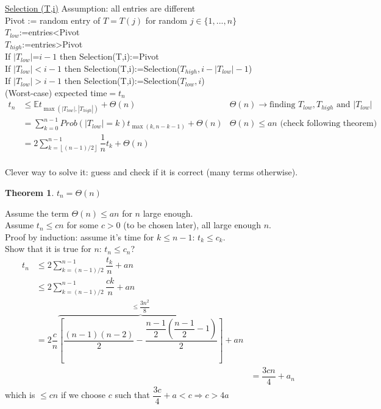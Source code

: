 \documentclass[12pt,a4paper]{report}
\theoremstyle{break}
\newtheorem{theorem}{Theorem}
\newenvironment{proof}[1][Proof]{\begin{trivlist}
\item[\hskip \labelsep {\bfseries #1}]}{\end{trivlist}}
\begin{document}
\underline{Selection (T,i)} \hspace*{3cm} Assumption: all entries are different\\

\hspace*{0.9cm} Pivot := random entry of $T=T(j)$ for random $j\in \lbrace 1,...,n\rbrace$\\
\hspace*{1.5cm} $T_{low}$:=entries<Pivot\\
\hspace*{1.5cm} $T_{high}$:=entries>Pivot\\
\hspace*{1.5cm} If $|T_{low}|$=$i-1$ then Selection(T,i):=Pivot\\
\hspace*{1.5cm} If $|T_{low}|<i-1$ then Selection(T,i):=Selection($T_{high},i-|T_{low}|-1$)\\
\hspace*{1.5cm} If $|T_{low}|>i-1$ then Selection(T,i):=Selection($T_{low},i$)\\

(Worst-case) expected time$=t_n$\\
\begin{align*}
t_n &\leq \mathbb{E} t_{\max(|T_{low}|,|T_{high}|)}+\Theta (n) & \Theta (n)\rightarrow \text{finding }T_{low},T_{high}\text{ and }|T_{low}|\\
&=\sum\limits_{k=0}^{n-1}Prob(|T_{low}|=k)t_{\max(k,n-k-1)}+\Theta (n) & \Theta (n)\leq an \text{ (check following theorem)}\\
&=2\sum\limits_{k=\left\lfloor (n-1)/2\right\rfloor}^{n-1}\dfrac{1}{n}t_k+\Theta (n)&\\
\end{align*}

Clever way to solve it: guess and check if it is correct (many terms otherwise).\\

\begin{theorem}
$t_n=\Theta (n)$
\end{theorem}
\begin{proof}
Assume the term $\Theta (n)\leq an$ for $n$ large enough.\\
Assume $t_n\leq cn$ for some $c>0$ (to be chosen later), all large enough $n$.\\
Proof by induction: assume it's time for $k\leq n-1$: $t_k\leq c_k$.\\
Show that it is true for $n$: $t_n\leq c_n$?
\begin{align*}
t_n &\leq 2\sum\limits_{k=(n-1)/2}^{n-1}\dfrac{t_k}{n}+an\\
&\leq 2\sum\limits_{k=(n-1)/2}^{n-1}\dfrac{ck}{n}+an\\
&=2\dfrac{c}{n}\overbrace{\left[\dfrac{(n-1)(n-2)}{2}-\dfrac{\dfrac{n-1}{2}\left(\dfrac{n-1}{2}-1\right)}{2}\right]}\limits^{\leq \dfrac{3n^2}{8}}+an\\&
&=\dfrac{3cn}{4}+a_n
\end{align*}
which is $\leq cn$ if we choose $c$ such that $\dfrac{3c}{4}+a<c \Rightarrow c>4a$
\end{proof}
\end{document}
